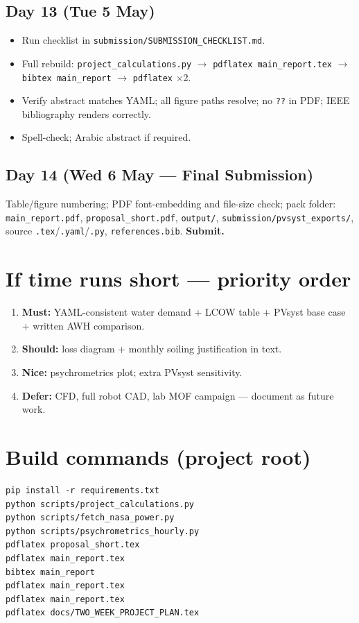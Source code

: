 \documentclass[11pt,a4paper]{article}
\begin{document}
\subsection{Day 13 (Tue 5 May)}
\begin{itemize}[nosep]
  \item Run checklist in \texttt{submission/SUBMISSION\_CHECKLIST.md}.
  \item Full rebuild: \texttt{project\_calculations.py} $\rightarrow$ \texttt{pdflatex main\_report.tex} $\rightarrow$ \texttt{bibtex main\_report} $\rightarrow$ \texttt{pdflatex} $\times$2.
  \item Verify abstract matches YAML; all figure paths resolve; no \texttt{??} in PDF; IEEE bibliography renders correctly.
  \item Spell-check; Arabic abstract if required.
\end{itemize}

\subsection{Day 14 (Wed 6 May --- Final Submission)}
Table/figure numbering; PDF font-embedding and file-size check; pack folder: \texttt{main\_report.pdf}, \texttt{proposal\_short.pdf}, \texttt{output/}, \texttt{submission/pvsyst\_exports/}, source \texttt{.tex}/\texttt{.yaml}/\texttt{.py}, \texttt{references.bib}. \textbf{Submit.}

\section{If time runs short --- priority order}
\begin{enumerate}[leftmargin=*]
  \item \textbf{Must:} YAML-consistent water demand + LCOW table + PVsyst base case + written AWH comparison.
  \item \textbf{Should:} loss diagram + monthly soiling justification in text.
  \item \textbf{Nice:} psychrometrics plot; extra PVsyst sensitivity.
  \item \textbf{Defer:} CFD, full robot CAD, lab MOF campaign --- document as future work.
\end{enumerate}

\section{Build commands (project root)}
\begin{verbatim}
pip install -r requirements.txt
python scripts/project_calculations.py
python scripts/fetch_nasa_power.py
python scripts/psychrometrics_hourly.py
pdflatex proposal_short.tex
pdflatex main_report.tex
bibtex main_report
pdflatex main_report.tex
pdflatex main_report.tex
pdflatex docs/TWO_WEEK_PROJECT_PLAN.tex
\end{verbatim}
\end{document}
